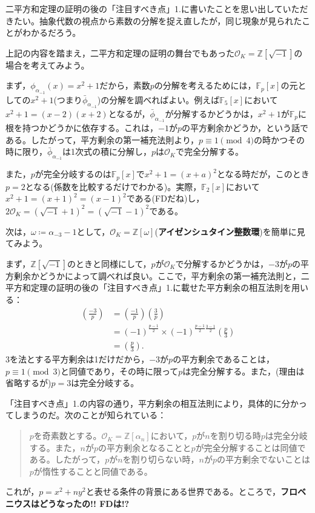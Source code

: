 二平方和定理の証明の後の「注目すべき点」1.に書いたことを思い出していただきたい。抽象代数の視点から素数の分解を捉え直したが，同じ現象が見られたことがわかるだろう。

上記の内容を踏まえ，二平方和定理の証明の舞台でもあった$\mathcal{O}_K=\mathds{Z}[\sqrt{-1}]$の場合を考えてみよう。

まず，$\phi_{\alpha_{-1}}(x)=x^2+1$だから，素数$p$の分解を考えるためには，$\mathds{F}_p[x]$の元としての$x^2+1$(つまり$\bar{\phi}_{\alpha_{-1}}$)の分解を調べればよい。例えば$\mathds{F}_5[x]$において$x^2+1=(x-2)(x+2)$となるが，$\bar{\phi}_{\alpha_{-1}}$が分解するかどうかは，$x^2+1$が$\mathds{F}_p$に根を持つかどうかに依存する。これは，$-1$が$p$の平方剰余かどうか，という話である。したがって，平方剰余の第一補充法則より，$p\equiv 1\pmod{4}$の時かつその時に限り，$\bar{\phi}_{\alpha_{-1}}$は1次式の積に分解し，$p$は$\mathcal{O}_K$で完全分解する。

また，$p$が完全分岐するのは$\mathds{F}_p[x]$で$x^2+1=(x+a)^2$となる時だが，このとき$p=2$となる(係数を比較するだけでわかる)。実際，$\mathds{F}_2[x]$において$x^2+1=(x+1)^2=(x-1)^2$である(\textsf{FD}だね)し，$2\mathcal{O}_K=(\sqrt{-1}+1)^2=(\sqrt{-1}-1)^2$である。

次は，$\omega\coloneqq\alpha_{-3}-1$として，$\mathcal{O}_K=\mathds{Z}[\omega]$(\textbf{アイゼンシュタイン整数環})を簡単に見てみよう。

まず，$\mathds{Z}[\sqrt{-1}]$のときと同様にして，$p$が$\mathcal{O}_K$で分解するかどうかは，$-3$が$p$の平方剰余かどうかによって調べれば良い。ここで，平方剰余の第一補充法則と，二平方和定理の証明の後の「注目すべき点」1.に載せた平方剰余の相互法則を用いる：
\begin{align*}
    \left(\frac{-3}{p}\right)&=\left(\frac{-1}{p}\right)\left(\frac{3}{p}\right)\\
    &=(-1)^{\frac{p-1}{2}}\times (-1)^{\frac{p-1}{2}\frac{3-1}{2}}\left(\frac{p}{3}\right)\\
    &=\left(\frac{p}{3}\right).
\end{align*}
3を法とする平方剰余は1だけだから，$-3$が$p$の平方剰余であることは，$p\equiv 1\pmod{3}$と同値であり，その時に限って$p$は完全分解する。また，(理由は省略するが)$p=3$は完全分岐する。

「注目すべき点」1.の内容の通り，平方剰余の相互法則により，具体的に分かってしまうのだ。次のことが知られている：
\begin{quote}
    $p$を奇素数とする。$\mathcal{O}_K=\mathds{Z}[\alpha_n]$において，$p$が$n$を割り切る時$p$は完全分岐する。また，$n$が$p$の平方剰余となることと$p$が完全分解することは同値である。したがって，$p$が$n$を割り切らない時，$n$が$p$の平方剰余でないことは$p$が惰性することと同値である。
\end{quote}

これが，$p=x^2+ny^2$と表せる条件の背景にある世界である。ところで，\textbf{フロベニウスはどうなったの!! \textsf{FD}は!?}










